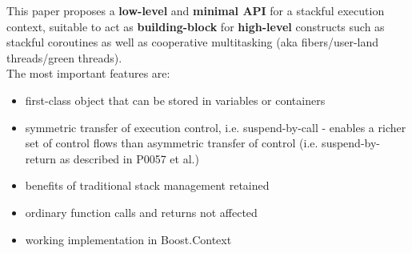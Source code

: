 This paper proposes a {\bfseries low-level} and {\bfseries minimal API} for a
stackful execution context, suitable to act as {\bfseries building-block} for
{\bfseries high-level} constructs such as stackful coroutines as well as
cooperative multitasking (aka fibers/user-land threads/green threads).\\
\newline
The most important features are:
\begin{itemize}
    \item first-class object that can be stored in variables or containers
    \item symmetric transfer of execution control, i.e. suspend-by-call -
          enables a richer set of control flows than asymmetric transfer of
          control (i.e. suspend-by-return as described in P0057\cite{P0057}
          et al.)
    \item benefits of traditional stack management retained
    \item ordinary function calls and returns not affected
    \item working implementation in Boost.Context\cite{bcontext}
\end{itemize}
